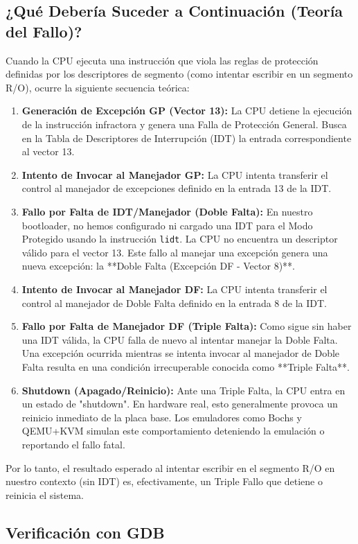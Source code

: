 \subsection{¿Qué Debería Suceder a Continuación (Teoría del Fallo)?}

Cuando la CPU ejecuta una instrucción que viola las reglas de protección definidas por los descriptores de segmento (como intentar escribir en un segmento R/O), ocurre la siguiente secuencia teórica:
\begin{enumerate}
    \item \textbf{Generación de Excepción GP (Vector 13):} La CPU detiene la ejecución de la instrucción infractora y genera una Falla de Protección General. Busca en la Tabla de Descriptores de Interrupción (IDT) la entrada correspondiente al vector 13.
    \item \textbf{Intento de Invocar al Manejador GP:} La CPU intenta transferir el control al manejador de excepciones definido en la entrada 13 de la IDT.
    \item \textbf{Fallo por Falta de IDT/Manejador (Doble Falta):} En nuestro bootloader, no hemos configurado ni cargado una IDT para el Modo Protegido usando la instrucción \texttt{lidt}. La CPU no encuentra un descriptor válido para el vector 13. Este fallo al manejar una excepción genera una nueva excepción: la **Doble Falta (Excepción DF - Vector 8)**.
    \item \textbf{Intento de Invocar al Manejador DF:} La CPU intenta transferir el control al manejador de Doble Falta definido en la entrada 8 de la IDT.
    \item \textbf{Fallo por Falta de Manejador DF (Triple Falta):} Como sigue sin haber una IDT válida, la CPU falla de nuevo al intentar manejar la Doble Falta. Una excepción ocurrida mientras se intenta invocar al manejador de Doble Falta resulta en una condición irrecuperable conocida como **Triple Falta**.
    \item \textbf{Shutdown (Apagado/Reinicio):} Ante una Triple Falta, la CPU entra en un estado de "shutdown". En hardware real, esto generalmente provoca un reinicio inmediato de la placa base. Los emuladores como Bochs y QEMU+KVM simulan este comportamiento deteniendo la emulación o reportando el fallo fatal.
\end{enumerate}
Por lo tanto, el resultado esperado al intentar escribir en el segmento R/O en nuestro contexto (sin IDT) es, efectivamente, un Triple Fallo que detiene o reinicia el sistema.

\subsection{Verificación con GDB}

